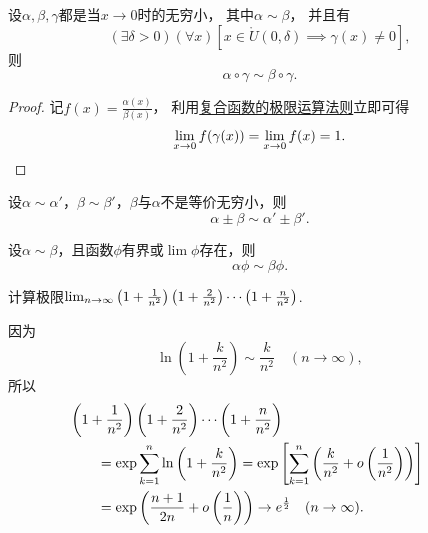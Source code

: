 \begin{proposition}[等价无穷小的换元法]\label{theorem:无穷小与无穷大.等价无穷小的换元法}
设\(\alpha,\beta,\gamma\)都是当\(x\to0\)时的无穷小，
其中\(\alpha \sim \beta\)，
并且有\[
	(\exists\delta>0)
	(\forall x)
	[
		x\in\mathring{U}(0,\delta)
		\implies
		\gamma(x) \neq 0
	],
\]
则\[
	\alpha\circ\gamma \sim \beta\circ\gamma.
\]
\begin{proof}
记\(f(x) = \frac{\alpha(x)}{\beta(x)}\)，
利用\hyperref[theorem:极限.复合函数的极限运算法则1]{复合函数的极限运算法则}立即可得\[
	\lim_{x\to0} f(\gamma(x))
	= \lim_{x\to0} f(x)
	= 1.
	\qedhere
\]
\end{proof}
\end{proposition}

\begin{proposition}[和差代替规则]\label{theorem:极限.无穷小的比较4}
设\(\alpha\sim\alpha'\)，\(\beta\sim\beta'\)，\(\beta\)与\(\alpha\)不是等价无穷小，则\[
	\alpha\pm\beta\sim\alpha'\pm\beta'.
\]
\end{proposition}

\begin{proposition}[因式代替规则]\label{theorem:极限.无穷小的比较5}
设\(\alpha\sim\beta\)，且函数\(\phi\)有界或\(\lim\phi\)存在，则\[
	\alpha \phi \sim \beta \phi.
\]
\end{proposition}

\begin{example}
计算极限\(\lim_{n\to\infty} \left(1+\frac1{n^2}\right)\left(1+\frac2{n^2}\right)\dotsm\left(1+\frac{n}{n^2}\vphantom{\frac1{n^2}}\right)\).
\begin{solution}
因为\[
	\ln\left(1+\frac{k}{n^2}\right)
	\sim \frac{k}{n^2}
	\quad(n\to\infty),
\]
所以\begin{align*}
	&\hspace{-20pt}
	\left(1+\frac1{n^2}\right)\left(1+\frac2{n^2}\right)\dotsm\left(1+\frac{n}{n^2}\vphantom{\frac1{n^2}}\right) \\
	&= \exp\sum_{k=1}^n \ln\left(1+\frac{k}{n^2}\right)
	= \exp\left[ \sum_{k=1}^n \left(\frac{k}{n^2} + o\left(\frac1{n^2}\right)\right) \right] \\
	&= \exp\left( \frac{n+1}{2n} + o\left(\frac1n\right) \right)
	\to e^{\frac12}
	\quad(n\to\infty).
\end{align*}
\end{solution}
\end{example}
